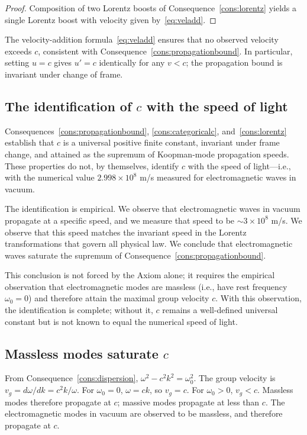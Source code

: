 \begin{proof}
Composition of two Lorentz boosts of Consequence~\ref{cons:lorentz} yields a single Lorentz boost with velocity given by~\eqref{eq:veladd}.
\end{proof}

\begin{remark}
The velocity-addition formula~\eqref{eq:veladd} ensures that no observed velocity exceeds $c$, consistent with Consequence~\ref{cons:propagationbound}. In particular, setting $u=c$ gives $u'=c$ identically for any $v<c$; the propagation bound is invariant under change of frame.
\end{remark}

\subsection{The identification of $c$ with the speed of light}

Consequences~\ref{cons:propagationbound}, \ref{cons:categoricalc}, and~\ref{cons:lorentz} establish that $c$ is a universal positive finite constant, invariant under frame change, and attained as the supremum of Koopman-mode propagation speeds. These properties do not, by themselves, identify $c$ with the speed of light---i.e., with the numerical value $2.998\times 10^{8}$ m/s measured for electromagnetic waves in vacuum.

The identification is empirical. We observe that electromagnetic waves in vacuum propagate at a specific speed, and we measure that speed to be $\sim 3\times 10^{8}$ m/s. We observe that this speed matches the invariant speed in the Lorentz transformations that govern all physical law. We conclude that electromagnetic waves saturate the supremum of Consequence~\ref{cons:propagationbound}.

This conclusion is not forced by the Axiom alone; it requires the empirical observation that electromagnetic modes are massless (i.e., have rest frequency $\omega_{0}=0$) and therefore attain the maximal group velocity $c$. With this observation, the identification is complete; without it, $c$ remains a well-defined universal constant but is not known to equal the numerical speed of light.

\subsection{Massless modes saturate $c$}

From Consequence~\ref{cons:dispersion}, $\omega^{2}-c^{2}k^{2}=\omega_{0}^{2}$. The group velocity is $v_{g}=d\omega/dk=c^{2}k/\omega$. For $\omega_{0}=0$, $\omega=ck$, so $v_{g}=c$. For $\omega_{0}>0$, $v_{g}<c$. Massless modes therefore propagate at $c$; massive modes propagate at less than $c$. The electromagnetic modes in vacuum are observed to be massless, and therefore propagate at $c$.

